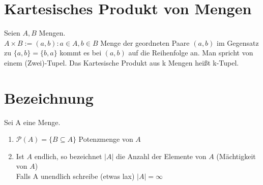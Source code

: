 \section{Kartesisches Produkt von Mengen}
Seien $A, B$ Mengen.\\
$A \times B := {(a, b): a \in A, b\in B}$ Menge der geordneten Paare $(a,b)$ im Gegensatz zu $\{a, b\} = \{b,a\}$ kommt es bei $(a, b)$ auf die Reihenfolge an. Man spricht von einem (Zwei)-Tupel. Das Kartesische Produkt aus k Mengen heißt k-Tupel.
\section{Bezeichnung}
Sei A eine Menge.
\begin{enumerate}
\item $\mathcal{P}(A) =\{B \subseteq A\}$ Potenzmenge von $A$
\item Ist $A$ endlich, so bezeichnet $\vert A \vert$ die Anzahl der Elemente von $A$ (Mächtigkeit von $A$)\\
Falls A unendlich schreibe (etwas lax) $\vert A \vert = \infty$
\end{enumerate}